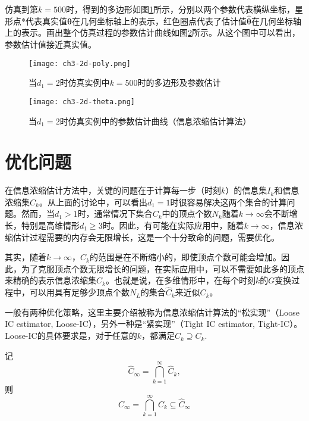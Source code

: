 仿真到第$k=500$时，得到的多边形如图\ref{fig.3.poly}所示，分别以两个参数代表横纵坐标，星形点*代表真实值$\bm{\theta}$在几何坐标轴上的表示，红色圈点代表了估计值$\hat{\bm{\theta}}$在几何坐标轴上的表示。画出整个仿真过程的参数估计曲线如图\ref{fig.3.theta.hat}所示。从这个图中可以看出，参数估计值接近真实值。
\begin{figure}[!h]
	\centering
	\texttt{[image: ch3-2d-poly.png]}\\	 %
	\caption{当$d_{1}=2$时仿真实例中$k=500$时的多边形及参数估计}
	\label{fig.3.poly}
\end{figure}

\begin{figure}[!h]
	\centering
	\texttt{[image: ch3-2d-theta.png]}\\	 %
	\caption{当$d_{1}=2$时仿真实例中的参数估计曲线（信息浓缩估计算法）}
	\label{fig.3.theta.hat}
\end{figure}

\section{优化问题}\label{sect:3.5}
在信息浓缩估计方法中，关键的问题在于计算每一步（时刻$k$）的信息集$I_{k}$和信息浓缩集$C_{k}$。从上面的讨论中，可以看出$d_{1}=1$时很容易解决这两个集合的计算问题。然而，当$d_{1}>1$时，通常情况下集合$C_{k}$中的顶点个数$N_{k}$随着$k\rightarrow\infty$会不断增长，特别是高维情形$d_{1}\geq3$时。因此，有可能在实际应用中，随着$k\rightarrow\infty$，信息浓缩估计过程需要的内存会无限增长，这是一个十分致命的问题，需要优化。

其实，随着$k\rightarrow\infty$，$C_{k}$的范围是在不断缩小的，即使顶点个数可能会增加。因此，为了克服顶点个数无限增长的问题，在实际应用中，可以不需要如此多的顶点来精确的表示信息浓缩集$C_{k}$。也就是说，在多维情形中，在每个时刻$k$的$G$变换过程中，可以用具有足够少顶点个数$N_{L}$的集合$\hat{C}_{k}$来近似$C_{k}$。

一般有两种优化策略，这里主要介绍被称为信息浓缩估计算法的“松实现”（Loose IC estimator, Loose-IC），另外一种是“紧实现”（Tight IC estimator, Tight-IC）。Loose-IC的具体要求是，对于任意的$k$，都满足$\hat{C}_k\supseteq C_k$.

记$$\hat{C}_{\infty}=\bigcap\limits_{k=1}^{\infty} \hat{C}_{k},$$
则
\begin{equation}\label{eq.loose}
C_{\infty}=\bigcap\limits_{k=1}^{\infty} C_{k}\subseteq \hat{C}_{\infty}
\end{equation}

